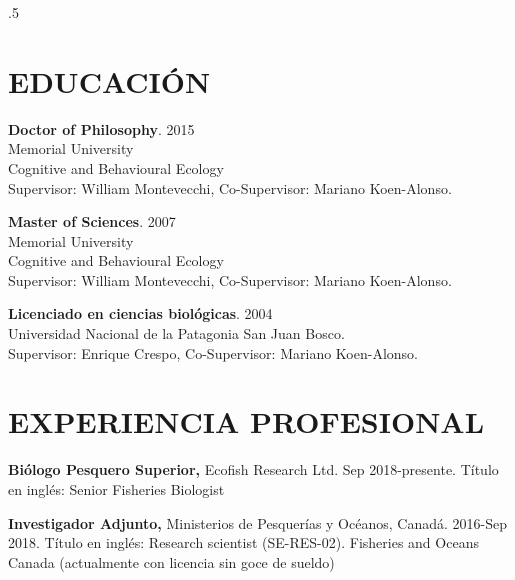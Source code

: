 \documentclass{res}
\begin{document}
\begin{resume}
\moveleft.5\sectionwidth\centerline{ }  


\section{EDUCACI\'ON}
\vspace{0.1in} 
 
\textbf{Doctor of Philosophy}. 2015 \\
Memorial University \\
Cognitive and Behavioural Ecology \\
Supervisor: William Montevecchi, Co-Supervisor: Mariano Koen-Alonso.

\textbf{Master of Sciences}. 2007 \\
Memorial University \\
Cognitive and Behavioural Ecology \\
Supervisor: William Montevecchi, Co-Supervisor: Mariano Koen-Alonso.

\textbf{Licenciado en ciencias biol\'ogicas}. 2004\\
Universidad Nacional de la Patagonia San Juan Bosco.\\
Supervisor: Enrique Crespo, Co-Supervisor: Mariano Koen-Alonso.



\section{EXPERIENCIA PROFESIONAL}
\vspace{0.1in}
\textbf{Bi\'ologo Pesquero Superior,} Ecofish Research Ltd. Sep 2018-presente. T\'{i}tulo en ingl\'{e}s: Senior Fisheries Biologist
	
\textbf{Investigador Adjunto,} Ministerios de Pesquer\'ias y Oc\'eanos, Canad\'a.  2016-Sep 2018. T\'{i}tulo en ingl\'es: Research scientist (SE-RES-02). Fisheries and Oceans Canada (actualmente con licencia sin goce de sueldo)


\end{resume}
\end{document}
